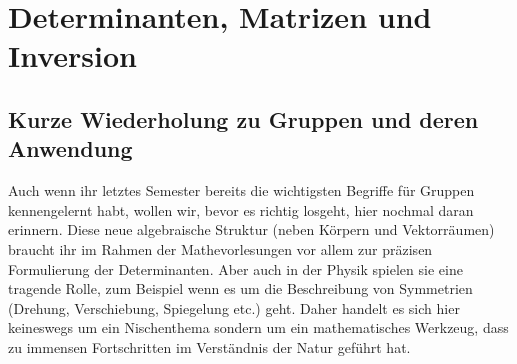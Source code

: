 \section[Determinanten II]{Determinanten, Matrizen und Inversion}

\subsection{Kurze Wiederholung zu Gruppen und deren Anwendung}
Auch wenn ihr letztes Semester bereits die wichtigsten Begriffe für Gruppen kennengelernt habt, wollen wir, bevor es richtig losgeht, hier nochmal daran erinnern. Diese neue algebraische Struktur (neben Körpern und Vektorräumen) braucht ihr im Rahmen der Mathevorlesungen vor allem zur präzisen Formulierung der Determinanten. Aber auch in der Physik spielen sie eine tragende Rolle, zum Beispiel wenn es um die Beschreibung von Symmetrien (Drehung, Verschiebung, Spiegelung etc.) geht. Daher handelt es sich hier keineswegs um ein Nischenthema sondern um ein mathematisches Werkzeug, dass zu immensen Fortschritten im Verständnis der Natur geführt hat. \\

